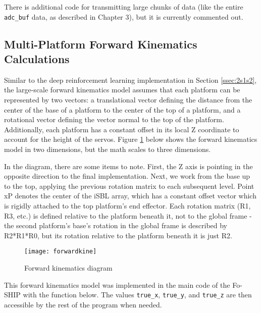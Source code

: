 \documentclass[12pt,a4paper]{report}
\begin{document}
There is additional code for transmitting large chunks of data (like the entire \verb|adc_buf| data, as described in Chapter 3), but it is currently commented out.

\subsection{Multi-Platform Forward Kinematics Calculations} \label{ssec:2s5s4}
Similar to the deep reinforcement learning implementation in Section \ref{ssec:2s1s2}, the large-scale forward kinematics model assumes that each platform can be represented by two vectors: a translational vector defining the distance from the center of the base of a platform to the center of the top of a platform, and a rotational vector defining the vector normal to the top of the platform. Additionally, each platform has a constant offset in its local Z coordinate to account for the height of the servos. Figure \ref{fig:forwardkine} below shows the forward kinematics model in two dimensions, but the math scales to three dimensions.

In the diagram, there are some items to note. First, the Z axis is pointing in the opposite direction to the final implementation. Next, we work from the base up to the top, applying the previous rotation matrix to each subsequent level. Point xP denotes the center of the iSBL array, which has a constant offset vector which is rigidly attached to the top platform’s end effector. Each rotation matrix (R1, R3, etc.) is defined relative to the platform beneath it, not to the global frame - the second platform’s base’s rotation in the global frame is described by R2*R1*R0, but its rotation relative to the platform beneath it is just R2.

\begin{figure}[!htbp]
	\centering
	\texttt{[image: forwardkine]}
	\caption{Forward kinematics diagram}
	\label{fig:forwardkine}
\end{figure}

This forward kinematics model was implemented in the main code of the Fo-SHIP with the function below. The values \verb|true_x|, \verb|true_y|, and \verb|true_z| are then accessible by the rest of the program when needed.
\end{document}
